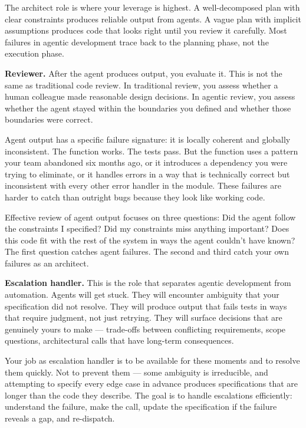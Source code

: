 \documentclass[
  a4paper,
  DIV=11,
  numbers=noendperiod]{scrreprt}
\begin{document}
The architect role is where your leverage is highest. A well-decomposed
plan with clear constraints produces reliable output from agents. A
vague plan with implicit assumptions produces code that looks right
until you review it carefully. Most failures in agentic development
trace back to the planning phase, not the execution phase.

\textbf{Reviewer.} After the agent produces output, you evaluate it.
This is not the same as traditional code review. In traditional review,
you assess whether a human colleague made reasonable design decisions.
In agentic review, you assess whether the agent stayed within the
boundaries you defined and whether those boundaries were correct.

Agent output has a specific failure signature: it is locally coherent
and globally inconsistent. The function works. The tests pass. But the
function uses a pattern your team abandoned six months ago, or it
introduces a dependency you were trying to eliminate, or it handles
errors in a way that is technically correct but inconsistent with every
other error handler in the module. These failures are harder to catch
than outright bugs because they look like working code.

Effective review of agent output focuses on three questions: Did the
agent follow the constraints I specified? Did my constraints miss
anything important? Does this code fit with the rest of the system in
ways the agent couldn't have known? The first question catches agent
failures. The second and third catch your own failures as an architect.

\textbf{Escalation handler.} This is the role that separates agentic
development from automation. Agents will get stuck. They will encounter
ambiguity that your specification did not resolve. They will produce
output that fails tests in ways that require judgment, not just
retrying. They will surface decisions that are genuinely yours to make
--- trade-offs between conflicting requirements, scope questions,
architectural calls that have long-term consequences.

Your job as escalation handler is to be available for these moments and
to resolve them quickly. Not to prevent them --- some ambiguity is
irreducible, and attempting to specify every edge case in advance
produces specifications that are longer than the code they describe. The
goal is to handle escalations efficiently: understand the failure, make
the call, update the specification if the failure reveals a gap, and
re-dispatch.
\end{document}
